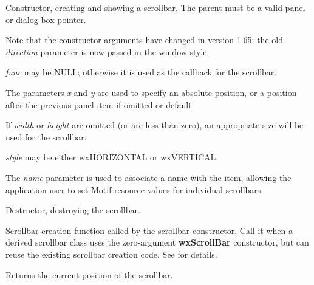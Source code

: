 Constructor, creating and showing a scrollbar. The parent must be a valid
panel or dialog box pointer.

Note that the constructor arguments have changed in version 1.65: the
old {\it direction} parameter is now passed in the window style.

{\it func} may be NULL; otherwise it is used as the callback for the
scrollbar.

The parameters {\it x} and {\it y} are used to specify an absolute
position, or a position after the previous panel item if omitted or
default.

If {\it width} or {\it height} are omitted (or are less than zero), an
appropriate size will be used for the scrollbar.

{\it style} may be either wxHORIZONTAL or wxVERTICAL.

The {\it name} parameter is used to associate
a name with the item, allowing the application user to set Motif resource values
for individual scrollbars.



Destructor, destroying the scrollbar.



Scrollbar creation function called by the scrollbar constructor. Call it
when a derived scrollbar class uses the zero-argument {\bf wxScrollBar}\rtfsp
constructor, but can reuse the existing scrollbar creation code.
See  for details.

\label{wxscrollbargetvalue}


Returns the current position of the scrollbar.

\label{wxscrollbargetvalues}

 
